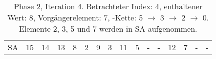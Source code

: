 \begin{table}[H]
\begin{adjustbox}{max width=\textwidth}
\begin{tabular}{lccccccccccccccc}
\multicolumn{1}{l|}{SA}      & \multicolumn{1}{c|}{15} & 14 & \multicolumn{1}{c|}{13} & \multicolumn{1}{c|}{\cellcolor[HTML]{\green}8} & \multicolumn{1}{c|}{\cellcolor[HTML]{\red}2} & \multicolumn{1}{c|}{9}    & \multicolumn{1}{c|}{\cellcolor[HTML]{\red}3} & \multicolumn{1}{c|}{11} & \multicolumn{1}{c|}{\cellcolor[HTML]{\red}5} & -  & \multicolumn{1}{c|}{-}  & 12 & \cellcolor[HTML]{\red}7 & -  & - 
\end{tabular}
\end{adjustbox}

\caption[Phase 2, Iteration 4]{Phase 2, Iteration 4. Betrachteter Index: 4, enthaltener Wert: 8, Vorgängerelement: 7, \prevpointer-Kette: 5 $\rightarrow$ 3 $\rightarrow$ 2 $\rightarrow$ 0. Elemente 2, 3, 5 und 7 werden in SA aufgenommen.}
\label{table_complex_example_2_4} 
\end{table}

